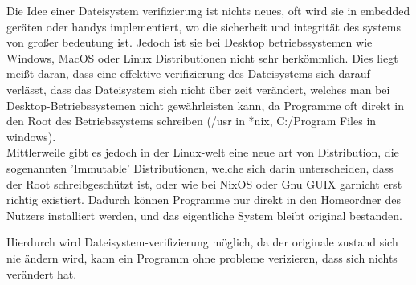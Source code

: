 Die Idee einer Dateisystem verifizierung ist nichts neues, oft wird sie in embedded geräten oder handys implementiert, wo die sicherheit und integrität des systems von großer bedeutung ist.
Jedoch ist sie bei Desktop betriebssystemen wie Windows, MacOS oder Linux Distributionen nicht sehr herkömmlich. Dies liegt meißt daran, dass eine effektive verifizierung des Dateisystems sich darauf verlässt, dass das Dateisystem sich nicht über zeit verändert, welches man bei Desktop-Betriebssystemen nicht gewährleisten kann, da Programme oft direkt in den Root des Betriebssystems schreiben (/usr in *nix, C:/Program Files in windows).
\\
Mittlerweile gibt es jedoch in der Linux-welt eine neue art von Distribution, die sogenannten 'Immutable' Distributionen, welche sich darin unterscheiden, dass der Root schreibgeschützt ist, oder wie bei NixOS oder Gnu GUIX garnicht erst richtig existiert. Dadurch können Programme nur direkt in den Homeordner des Nutzers installiert werden, und das eigentliche System bleibt original bestanden.

Hierdurch wird Dateisystem-verifizierung möglich, da der originale zustand sich nie ändern wird, kann ein Programm ohne probleme verizieren, dass sich nichts verändert hat.





